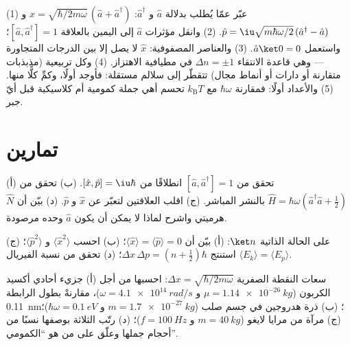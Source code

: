 \begin{method}\label{met:b3:harmonic-oscillator:method}
(1) عبّر عمّا يُطلب بدلالة $\hat a$ و $\hat a^\dagger$: $\hat x
= \sqrt{\hbar/2m\omega}\,(\hat a + \hat a^\dagger)$ و $\hat p =
\iu\sqrt{m\hbar\omega/2}\,(\hat a^\dagger - \hat a)$. (2) وانقل
مؤثرات $\hat a$ إلى اليمين بالعلاقة $[\hat a, \hat a^\dagger] = 1$؛ واستعمل
$\hat a\ket0 = 0$. (3) والعناصر المصفوفية: $\hat x$ لا يصل إلا بين
الدرجات المتجاورة --- وهي قاعدة الانتقاء $\Delta n = \pm1$ في
مطيافية الاهتزاز. (4) وكل  تربيعية (مذبذبات متقارنة
أو دارات أو أنماط مجال) تتقطّر إلى سلالم مستقلة: فأوجد
 أولًا، وكمِّ كلًّا منها. (5) والأعداد
أولًا: فمقارنة $\hbar\omega$ مع $k_{\text{B}}T$ تحسم أهي جملة
كمومية أم كلاسيكية قبل أيّ جبر.
\end{method}

\section{تمارين}

\begin{exercise}[$\star$]\label{exo:b3:harmonic-oscillator:1}
(أ) تحقق من $[\hat a, \hat a^\dagger] = 1$ انطلاقًا من $[\hat x, \hat p] =
\iu\hbar$. (ب) تحقق من $\hat H = \hbar\omega(\hat a^\dagger\hat a +
\tfrac12)$ بالنشر المباشر. (ج) اقلب العلاقتين لتعبّر عن $\hat x$ و
$\hat p$. (د) بيّن أن $\hat N$ هرميتي واشرح لماذا لا يمكن أن يكون $\hat a$
وحده مرصودة.
\end{exercise}

\begin{exercise}[$\star$]\label{exo:b3:harmonic-oscillator:2}
على الحالة الذاتية $\ket n$: (أ) بيّن أن $\langle\hat x\rangle =
\langle\hat p\rangle = 0$؛ (ب) احسب $\langle\hat x^2\rangle$ و
$\langle\hat p^2\rangle$؛ (ج) استنتج $\Delta x\,\Delta p = (n +
\tfrac12)\hbar$؛ (د) تحقق من نسبة الفيريال $\langle E_k\rangle =
\langle E_p\rangle$.
\end{exercise}

\begin{exercise}[$\star$]\label{exo:b3:harmonic-oscillator:3}
سعات النقطة الصفرية $\Delta x = \sqrt{\hbar/2m\omega}$: احسبها
من أجل (أ) جزيء أحادي أكسيد الكربون ($\mu = \qty{1.14e-26}{kg}$ و $\omega =
\qty{4.1e14}{rad/s}$)، مقارنةً بطول الرابطة
\qty{0.11}{nm}؛ (ب) ذرة هدروجين في جسم صلب ($m =
\qty{1.7e-27}{kg}$ و $\hbar\omega = \qty{0.1}{eV}$)؛ (ج) مرآة من مرايا
لايغو ($m = \qty{40}{kg}$ و $f = \qty{100}{Hz}$)؛ (د) رتّب الثلاثة
بوصفها نسبًا من أحجام جملها وعلّق على من هو
``الكمومي''.
\end{exercise}


